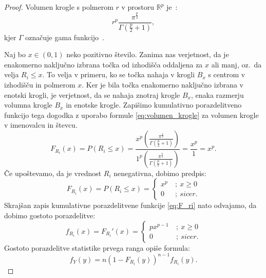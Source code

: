 \documentclass[12pt,a4paper,twoside]{article}
\theoremstyle{definition} %
\theoremstyle{plain} %
\numberwithin{equation}{section}  %
\begin{document}
\begin{proof}
	Volumen krogle s polmerom $r$ v prostoru $\mathbb{R}^p$ je~\cite[enačba~5.19.4]{nist_dlmf}:
	\begin{equation}
	\label{eq:volumen_krogle}
		r^p \frac{\pi^{\frac{p}{2}}}{\Gamma (\frac{p}{2}+1)},
	\end{equation}
	kjer $\Gamma$ označuje gama funkcijo~\cite[enačba~5.4.1]{nist_dlmf}. %
	
	Naj bo $x \in (0,1)$ neko pozitivno število.
	Zanima nas verjetnost, da je enakomerno naključno izbrana točka od izhodišča oddaljena za $x$ ali manj, oz.~da velja $R_i \leq x$.
	To velja v primeru, ko se točka nahaja v krogli $B_x$ s centrom v izhodišču in polmerom $x$.
	Ker je bila točka enakomerno naključno izbrana v enotski krogli, je verjetnost, da se nahaja znotraj krogle $B_x$, enaka razmerju volumna krogle $B_x$ in enotske krogle.
	Zapišimo kumulativno porazdelitveno funkcijo tega dogodka z uporabo formule \ref{eq:volumen_krogle} za volumen krogle v imenovalcu in števcu.
	\begin{equation*}
		F_{R_i}(x) = 
		P(R_i \leq x) = 
		\frac{x^p \left( \frac{\pi^{\frac{p}{2}}}{\Gamma (\frac{p}{2}+1)} \right)}{1^p \left( \frac{\pi^{\frac{p}{2}}}{\Gamma (\frac{p}{2}+1)} \right)} =
		\frac{x^p}{1} = x^p.
	\end{equation*}
	Če upoštevamo, da je vrednost $R_i$ nenegativna, dobimo predpis:
	\begin{equation}
	\label{eq:F_ri}
		F_{R_i}(x) = 
		P(R_i \leq x) = 
		\begin{cases}
			x^p\ &;\ x \geq 0 \\
			0\ &;\ sicer.
		\end{cases}
	\end{equation}
	Skrajšan zapis kumulativne porazdelitvene funkcije \ref{eq:F_ri} nato odvajamo, da dobimo gostoto porazdelitve:
	\begin{equation}
	\label{eq:f_ri}
		f_{R_i}(x) = 
		F_{R_i} '(x) =
		\begin{cases}
			p x^{p-1}\ &;\ x \geq 0 \\
			0\ &;\ sicer.
		\end{cases} 
	\end{equation}
	Gostoto porazdelitve statistike prvega ranga \cite[pogl.~4.6]{hogg2005introduction} opiše formula:
	\begin{equation*}
		f_Y(y) = n(1 - F_{R_i}(y))^{n-1} f_{R_i}(y).
	\end{equation*}

\end{proof}
\end{document}
